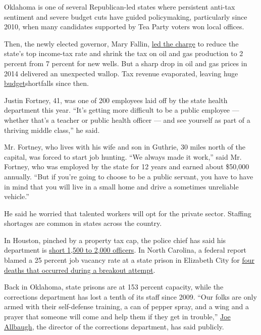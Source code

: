 Oklahoma is one of several Republican-led states where persistent
anti-tax sentiment and severe budget cuts have guided policymaking,
particularly since 2010, when many candidates supported by Tea Party
voters won local offices.

Then, the newly elected governor, Mary Fallin,
\href{https://www.npr.org/2017/06/19/533556306/in-oklahoma-gop-lawmakers-support-tax-increases-to-solve-budget-crisis}{led
the charge} to reduce the state's top income-tax rate and shrink the tax
on oil and gas production to 2 percent from 7 percent for new wells. But
a sharp drop in oil and gas prices in 2014 delivered an unexpected
wallop. Tax revenue evaporated, leaving huge
\href{https://okpolicy.org/budget-trends-outlook-march-2018/}{budget}shortfalls
since then.

Justin Fortney, 41, was one of 200 employees laid off by the state
health department this year. ``It's getting more difficult to be a
public employee --- whether that's a teacher or public health officer
--- and see yourself as part of a thriving middle class,'' he said.

Mr. Fortney, who lives with his wife and son in Guthrie, 30 miles north
of the capital, was forced to start job hunting. ``We always made it
work,'' said Mr. Fortney, who was employed by the state for 12 years and
earned about \$50,000 annually. ``But if you're going to choose to be a
public servant, you have to have in mind that you will live in a small
home and drive a sometimes unreliable vehicle.''

He said he worried that talented workers will opt for the private
sector. Staffing shortages are common in states across the country.

In Houston, pinched by a property tax cap, the police chief has said his
department is
\href{https://www.cnbc.com/2018/02/02/where-the-jobs-are-houstons-police-shortage.html}{short
1,500 to 2,000 officers}. In North Carolina, a federal report blamed a
25 percent job vacancy rate at a state prison in Elizabeth City for
\href{https://www.usnews.com/news/best-states/north-carolina/articles/2018-01-25/report-understaffing-corners-cut-at-prison-where-4-died}{four
deaths that occurred during a breakout attempt}.

Back in Oklahoma, state prisons are at 153 percent capacity, while the
corrections department has lost a tenth of its staff since 2009. ``Our
folks are only armed with their self-defense training, a can of pepper
spray, and a wing and a prayer that someone will come and help them if
they get in trouble,''
\href{http://www.newson6.com/story/37780039/doc-asks-for-15-billion-for-new-prisons-training-and-pay-raises}{Joe
Allbaugh}, the director of the corrections department, has said
publicly.

